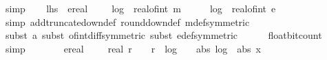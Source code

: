 \begin{isabellebody}
\ simp\isanewline
\isanewline
\ \ \isamarkupfalse%
\ {\isachardoublequoteopen}{\isacharquery}{\kern0pt}lhs\ {\isasymle}\ ereal\ {\isacharparenleft}{\kern0pt}{}\ {\isacharplus}{\kern0pt}\ {\isacharparenleft}{\kern0pt}{}\ {\isacharasterisk}{\kern0pt}\ log\ {}\ {\isacharparenleft}{\kern0pt}real{\isacharunderscore}{\kern0pt}of{\isacharunderscore}{\kern0pt}int\ {\isacharparenleft}{\kern0pt}{\isasymbar}m{\isasymbar}\ {\isacharplus}{\kern0pt}\ {}{\isacharparenright}{\kern0pt}{\isacharparenright}{\kern0pt}\ {\isacharplus}{\kern0pt}\ {}\ {\isacharasterisk}{\kern0pt}\ log\ {}\ {\isacharparenleft}{\kern0pt}real{\isacharunderscore}{\kern0pt}of{\isacharunderscore}{\kern0pt}int\ {\isacharparenleft}{\kern0pt}{\isasymbar}e{\isasymbar}\ {\isacharplus}{\kern0pt}\ {}{\isacharparenright}{\kern0pt}{\isacharparenright}{\kern0pt}{\isacharparenright}{\kern0pt}{\isacharparenright}{\kern0pt}{\isachardoublequoteclose}\isanewline
\ \ \ \ \isamarkupfalse%
\ {\isacharparenleft}{\kern0pt}simp\ add{\isacharcolon}{\kern0pt}truncate{\isacharunderscore}{\kern0pt}down{\isacharunderscore}{\kern0pt}def\ round{\isacharunderscore}{\kern0pt}down{\isacharunderscore}{\kern0pt}def\ m{\isacharunderscore}{\kern0pt}def{\isacharbrackleft}{\kern0pt}symmetric{\isacharbrackright}{\kern0pt}{\isacharparenright}{\kern0pt}\isanewline
\ \ \ \ \isamarkupfalse%
\ {\isacharparenleft}{\kern0pt}subst\ a{\isacharcomma}{\kern0pt}\ subst\ of{\isacharunderscore}{\kern0pt}int{\isacharunderscore}{\kern0pt}diff{\isacharbrackleft}{\kern0pt}symmetric{\isacharbrackright}{\kern0pt}{\isacharcomma}{\kern0pt}\ subst\ e{\isacharunderscore}{\kern0pt}def{\isacharbrackleft}{\kern0pt}symmetric{\isacharbrackright}{\kern0pt}{\isacharparenright}{\kern0pt}\isanewline
\ \ \ \ \isamarkupfalse%
\ float{\isacharunderscore}{\kern0pt}bit{\isacharunderscore}{\kern0pt}count\ \isamarkupfalse%
\ simp\isanewline
\ \ \isamarkupfalse%
\ \isamarkupfalse%
\ {\isachardoublequoteopen}{\isachardot}{\kern0pt}{\isachardot}{\kern0pt}{\isachardot}{\kern0pt}\ {\isasymle}\ ereal\ {\isacharparenleft}{\kern0pt}{}\ {\isacharplus}{\kern0pt}\ {\isacharparenleft}{\kern0pt}{}\ {\isacharasterisk}{\kern0pt}\ real\ {\isacharparenleft}{\kern0pt}r{\isacharplus}{\kern0pt}{}{\isacharparenright}{\kern0pt}\ {\isacharplus}{\kern0pt}\ {}\ {\isacharasterisk}{\kern0pt}\ {\isacharparenleft}{\kern0pt}r\ {\isacharplus}{\kern0pt}\ log\ {}\ {\isacharparenleft}{\kern0pt}{}\ {\isacharplus}{\kern0pt}\ abs\ {\isacharparenleft}{\kern0pt}log\ {}\ {\isacharparenleft}{\kern0pt}abs\ x{\isacharparenright}{\kern0pt}{\isacharparenright}{\kern0pt}{\isacharparenright}{\kern0pt}{\isacharparenright}{\kern0pt}{\isacharparenright}{\kern0pt}{\isacharparenright}{\kern0pt}{\isachardoublequoteclose}\isanewline

\end{isabellebody}
